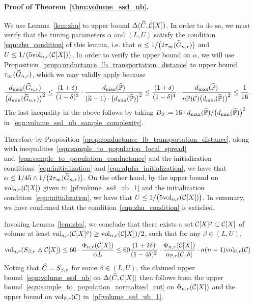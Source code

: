 \paragraph{Proof of Theorem~\ref{thm:volume_ssd_ub}.}
We use Lemma~\ref{lem:zhu} to upper bound $\Delta(\widehat{C},\mathcal{C}[X])$. In order to do so, we must verify that the tuning parameters $\alpha$ and $(L,U)$ satisfy the condition \eqref{eqn:zhu_condition} of this lemma, i.e. that $\alpha \leq 1/\bigl(2\tau_{\infty}(\widetilde{G}_{n,r})\bigr)$ and $U \leq 1/\bigl(5 \mathrm{vol}_{n,r}(\mathcal{C}[X])\bigr)$. In order to verify the upper bound on $\alpha$, we will use Proposition~\ref{prop:conductance_lb_transportation_distance} to upper bound $\tau_{\infty}(\widetilde{G}_{n,r})$, which we may validly apply because
\begin{equation*}
\frac{d_{\max}(\widetilde{G}_{n,r})}{\bigl(d_{\min}(\widetilde{G}_{n,r})\bigr)^2} \leq \frac{(1 + \delta)}{(1 - \delta)^2} \cdot \frac{d_{\max}(\widetilde{\mathbb{P}})}{(\widetilde{n} - 1) \cdot \bigl(d_{\min}(\widetilde{\mathbb{P}})\bigr)^2} \leq \frac{(1 + \delta)}{(1 - \delta)^4} \cdot \frac{d_{\max}(\widetilde{\mathbb{P}})}{n\mathbb{P}(\mathcal{C})\bigl(d_{\min}(\widetilde{\mathbb{P}})\bigr)^2} \leq \frac{1}{16}.
\end{equation*}
The last inequality in the above follows by taking $B_3 := 16 \cdot d_{\max}(\widetilde{\mathbb{P}})/\bigl(d_{\min}(\widetilde{\mathbb{P}})\bigr)^2$ in~\eqref{eqn:volume_ssd_ub_sample_complexity}.

Therefore by Proposition~\ref{prop:conductance_lb_transportation_distance}, along with inequalities~\eqref{eqn:sample_to_population_local_spread} and~\eqref{eqn:sample_to_population_conductance} and the initialization conditions~\eqref{eqn:initialization} and \eqref{eqn:alpha_initialization}, we have that $\alpha \leq 1/45 \wedge 1/\bigl(2\tau_{\infty}(\widetilde{G}_{n,r})\bigr)$.  
On the other hand, by the upper bound on $\mathrm{vol}_{n,r}(\mathcal{C}[X])$ given in~\eqref{pf:volume_ssd_ub_1} and the initialization condition~\eqref{eqn:initialization}, we have that $U \leq 1/\bigl(5 \mathrm{vol}_{n,r}(\mathcal{C}[X])\bigr)$. In summary, we have confirmed that the condition~\eqref{eqn:zhu_condition} is satisfied.

Invoking Lemma~\ref{lem:zhu}, we conclude that there exists a set $\mathcal{C}[X]^g \subset \mathcal{C}[X]$ of volume at least $\mathrm{vol}_{n,r}(\mathcal{C}[X]^g) \geq \mathrm{vol}_{n,r}(\mathcal{C}[X])/2$, such that for any $\beta \in (L,U)$,
\begin{equation*}
\mathrm{vol}_{n,r}(S_{\beta,v} \vartriangle \mathcal{C}[X]) \leq 60 \cdot \frac{\Phi_{n,r}(\mathcal{C}[X])}{\alpha L} \leq 60 \frac{(1 + 2\delta)}{(1 - 4\delta)^2} \cdot \frac{\Phi_{n,r}(\mathcal{C}[X])}{\alpha_{\mathbb{P},r}(\mathcal{C},\delta)}\cdot n(n-1)\mathrm{vol}_{\mathbb{P},r}(\mathcal{C})
\end{equation*}
Noting that $\widehat{C} = S_{\beta,v}$ for some $\beta \in (L,U)$, the claimed upper bound~\eqref{eqn:volume_ssd_ub} on $\Delta(\widehat{C},\mathcal{C}[X])$ then follows from the upper bound~\eqref{eqn:sample_to_population_normalized_cut} on $\Phi_{n,r}(\mathcal{C}[X])$ and the upper bound on $\mathrm{vol}_{\mathbb{P},r}(\mathcal{C})$ in~\eqref{pf:volume_ssd_ub_1}.

